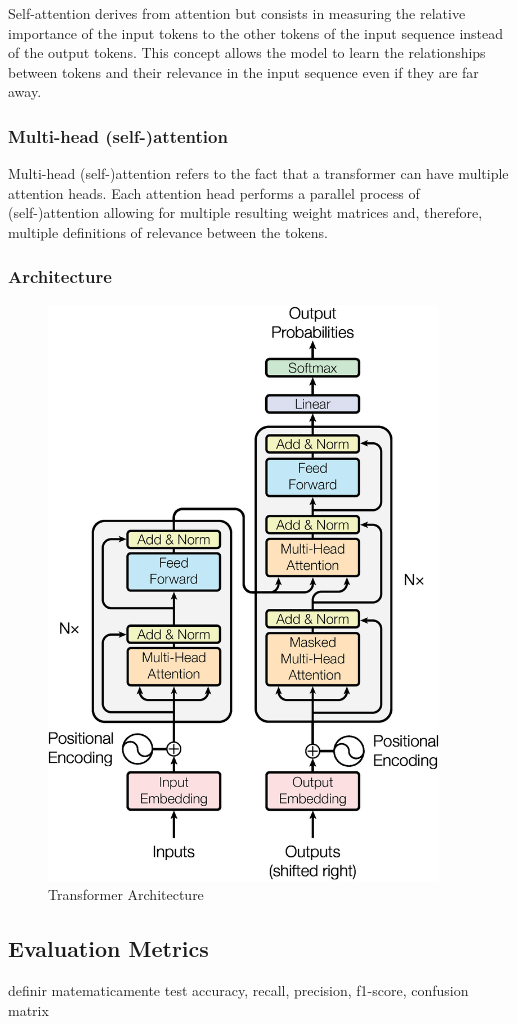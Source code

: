 Self-attention derives from attention but consists in measuring the relative importance of the input tokens to the other tokens of the input sequence instead of the output tokens. This concept allows the model to learn the relationships between tokens and their relevance in the input sequence even if they are far away.
 
\subsubsection{Multi-head (self-)attention}

Multi-head (self-)attention refers to the fact that a transformer can have multiple attention heads. Each attention head performs a parallel process of (self-)attention allowing for multiple resulting weight matrices and, therefore, multiple definitions of relevance between the tokens.

\subsubsection{Architecture}

\begin{figure}[h]
\centerline{\includegraphics[height=6in]{figs/transformer.jpg}}
\caption[Transformer Architecture]{Transformer Architecture \cite{Vaswani2017}}
\label{fig:transformer_arch}
\end{figure}

\subsection{Evaluation Metrics}

definir matematicamente test accuracy, recall, precision, f1-score, confusion matrix